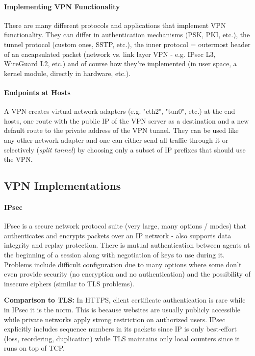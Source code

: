 \paragraph{Implementing VPN Functionality}
There are many different protocols and applications that implement VPN functionality. They can differ in authentication mechanisms (PSK, PKI, etc.), the tunnel protocol (custom ones, SSTP, etc.), the inner protocol = outermost header of an encapsulated packet (network vs. link layer VPN - e.g. IPsec L3, WireGuard L2, etc.) and of course how they're implemented (in user space, a kernel module, directly in hardware, etc.).

\paragraph{Endpoints at Hosts}
A VPN creates virtual network adapters (e.g. "eth2", "tun0", etc.) at the end hosts, one route with the public IP of the VPN server as a destination and a new default route to the private address of the VPN tunnel. They can be used like any other network adapter and one can either send all traffic through it or selectively (\textit{split tunnel}) by choosing only a subset of IP prefixes that should use the VPN. %


\subsection{VPN Implementations}

\paragraph{IPsec}
IPsec is a secure network protocol suite (very large, many options / modes) that authenticates and encrypts packets over an IP network - also supports data integrity and replay protection. There is mutual authentication between agents at the beginning of a session along with negotiation of keys to use during it. Problems include difficult configuration due to many options where some don't even provide security (no encryption and no authentication) and the possibility of insecure ciphers (similar to TLS problems).

\textbf{Comparison to TLS:} In HTTPS, client certificate authentication is rare while in IPsec it is the norm. This is because websites are usually publicly accessible while private networks apply strong restriction on authorized users. IPsec explicitly includes sequence numbers in its packets since IP is only best-effort (loss, reordering, duplication) while TLS maintains only local counters since it runs on top of TCP.


